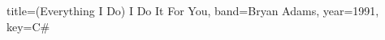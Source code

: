\documentclass{../../tex/bekki-leadsheet}
\begin{document}
\begin{song}{title={(Everything I Do) I Do It For You}, band={Bryan Adams}, year={1991}, key={C#}}

  

\end{song}
\end{document}
